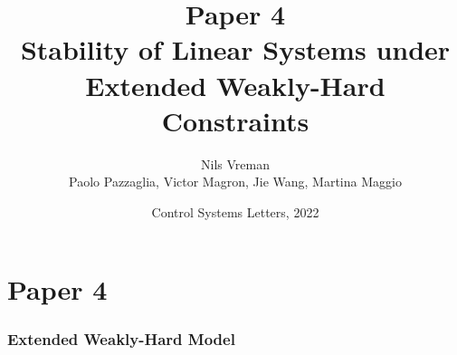 \section{Paper 4}

\title[PhD Defence]{
    {\Huge Paper 4} \\
    \vspace{2mm}
    {\Large Stability of Linear Systems under\\Extended Weakly-Hard Constraints} \\
}
\author[Nils Vreman]{
    Nils Vreman \\
    \vspace{3mm}
    {\large Paolo Pazzaglia, Victor Magron, Jie Wang, Martina Maggio}
}
\date[LCSS 2022]{
    Control Systems Letters, 2022\\
}
\notitlelogo
{}


\begin{frame}
    \frametitle{Extended Weakly-Hard Model}
    \begin{figure}[h]
        \centering
    \end{figure}
\end{frame}

